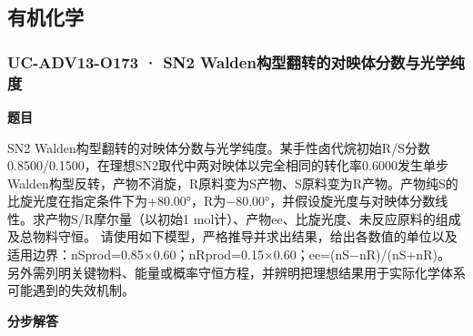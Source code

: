 \documentclass[UTF8,11pt,a4paper]{ctexart}
\begin{document}
\subsection*{有机化学}
\subsubsection*{UC-ADV13-O173 · SN2 Walden构型翻转的对映体分数与光学纯度}
\noindent\textbf{题目}\par
SN2 Walden构型翻转的对映体分数与光学纯度。某手性卤代烷初始R/S分数0.8500/0.1500，在理想SN2取代中两对映体以完全相同的转化率0.6000发生单步Walden构型反转，产物不消旋，R原料变为S产物、S原料变为R产物。产物纯S的比旋光度在指定条件下为+80.00°，R为−80.00°，并假设旋光度与对映体分数线性。求产物S/R摩尔量（以初始1 mol计）、产物ee、比旋光度、未反应原料的组成及总物料守恒。 请使用如下模型，严格推导并求出结果，给出各数值的单位以及适用边界：nSprod=0.85×0.60；nRprod=0.15×0.60；ee=(nS−nR)/(nS+nR)。 另外需列明关键物料、能量或概率守恒方程，并辨明把理想结果用于实际化学体系可能遇到的失效机制。\par
\medskip\noindent\textbf{分步解答}
\end{document}
